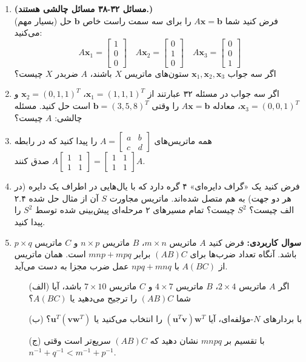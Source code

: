 \documentclass[12pt, a4paper]{book}
\begin{document}
\begin{enumerate}
		\item \textbf{(مسائل ۳۲-۳۸ مسائل چالشی هستند.)}\\
		(بسیار مهم) فرض کنید شما $A\mathbf{x}=\mathbf{b}$ را برای سه سمت راست خاص $\mathbf{b}$ حل می‌کنید:
		\[ A\mathbf{x}_1 = \begin{bmatrix} 1 \\ 0 \\ 0 \end{bmatrix} \quad A\mathbf{x}_2 = \begin{bmatrix} 0 \\ 1 \\ 0 \end{bmatrix} \quad A\mathbf{x}_3 = \begin{bmatrix} 0 \\ 0 \\ 1 \end{bmatrix} \]
		اگر سه جواب $\mathbf{x}_1, \mathbf{x}_2, \mathbf{x}_3$ ستون‌های ماتریس $X$ باشند، $A$ ضربدر $X$ چیست؟
		
		\item اگر سه جواب در مسئله ۳۲ عبارتند از $\mathbf{x}_1=(1,1,1)^T$، $\mathbf{x}_2=(0,1,1)^T$ و $\mathbf{x}_3=(0,0,1)^T$، معادله $A\mathbf{x}=\mathbf{b}$ را وقتی $\mathbf{b}=(3,5,8)^T$ است حل کنید. مسئله چالشی: $A$ چیست؟
		
		\item همه ماتریس‌های $A = \begin{bmatrix} a & b \\ c & d \end{bmatrix}$ را پیدا کنید که در رابطه $A \begin{bmatrix} 1 & 1 \\ 1 & 1 \end{bmatrix} = \begin{bmatrix} 1 & 1 \\ 1 & 1 \end{bmatrix} A$ صدق کنند.
		
		\item فرض کنید یک «گراف دایره‌ای» ۴ گره دارد که با یال‌هایی در اطراف یک دایره (در هر دو جهت) به هم متصل شده‌اند. ماتریس مجاورت $S$ آن از مثال حل شده ۲.۴ الف چیست؟ $S^2$ چیست؟ تمام مسیرهای ۲ مرحله‌ای پیش‌بینی شده توسط $S^2$ را پیدا کنید.
		
		\item \textbf{سوال کاربردی:} فرض کنید $A$ ماتریس $m \times n$، $B$ ماتریس $n \times p$ و $C$ ماتریس $p \times q$ باشد. آنگاه تعداد ضرب‌ها برای $(AB)C$ برابر $mnp+mpq$ است. همان ماتریس از $A(BC)$ با $npq+mnq$ عمل ضرب مجزا به دست می‌آید.
		\begin{itemize}
			\item[(الف)] اگر $A$ ماتریس $2 \times 4$، $B$ ماتریس $4 \times 7$ و $C$ ماتریس $7 \times 10$ باشد، آیا شما $(AB)C$ را ترجیح می‌دهید یا $A(BC)$؟
			\item[(ب)] با بردارهای $N$-مؤلفه‌ای، آیا $(\mathbf{u}^T\mathbf{v})\mathbf{w}^T$ را انتخاب می‌کنید یا $\mathbf{u}^T(\mathbf{v}\mathbf{w}^T)$؟
			\item[(ج)] با تقسیم بر $mnpq$ نشان دهید که $(AB)C$ سریع‌تر است وقتی $n^{-1}+q^{-1} < m^{-1}+p^{-1}$.
		\end{itemize}
		

\end{enumerate}
\end{document}
